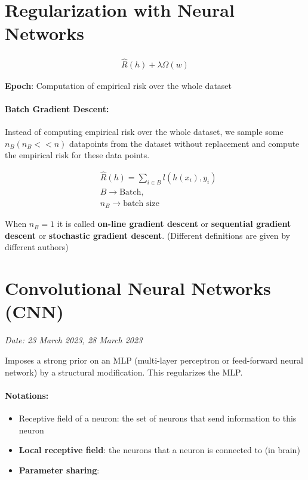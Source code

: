 \documentclass[11pt]{article}
\begin{document}
\section{Regularization with Neural Networks}
\label{sec:regul-with-neur}

\begin{align*}
  \hat{R}(h) + \lambda \Omega(w)
\end{align*}

\textbf{Epoch}: Computation of empirical risk over the whole dataset \\

\paragraph{Batch Gradient Descent:}
Instead of computing empirical risk over the whole dataset, we sample some $n_B(n_B << n)$ datapoints from the dataset without replacement and compute the empirical risk for these data points.

\begin{align*}
  &\hat{R}(h) = \sum_{i \in B} l(h(x_i), y_i) \\
  &B \rightarrow \text{Batch}, \\
  &n_B \rightarrow \text{batch size}
\end{align*}

When $n_B = 1$ it is called \textbf{on-line gradient descent} or \textbf{sequential gradient descent} or \textbf{stochastic gradient descent}. (Different definitions are given by different authors)

\section{Convolutional Neural Networks (CNN)}
\label{sec:conv-neur-netw}

\textit{Date: 23 March 2023, 28 March 2023}

Imposes a strong prior on an MLP (multi-layer perceptron or feed-forward neural network) by a structural modification. This regularizes the MLP. \\

\paragraph{Notations:}
\begin{itemize}
\item Receptive field of a neuron: the set of neurons that send information to this neuron
\item \textbf{Local receptive field}: the neurons that a neuron is connected to (in brain)
\item \textbf{Parameter sharing}: 
\end{itemize}
\end{document}
